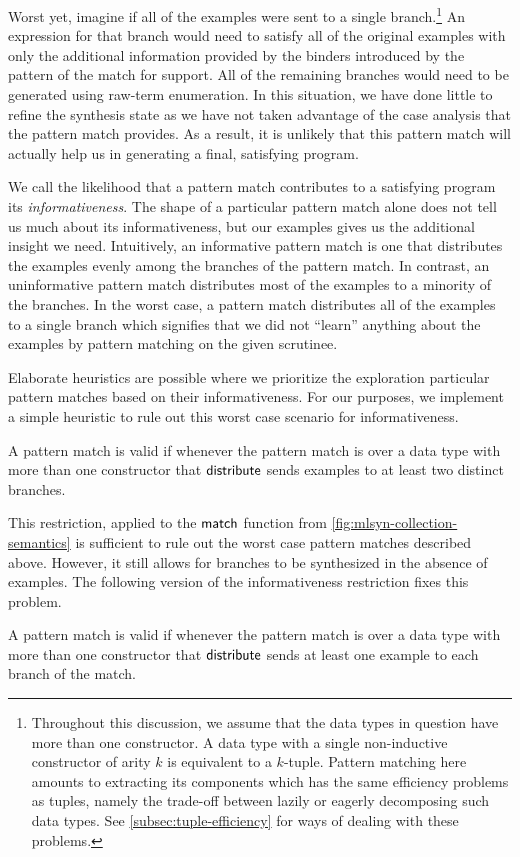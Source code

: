 Worst yet, imagine if all of the examples were sent to a single branch.\footnote{%
  Throughout this discussion, we assume that the data types in question have more than one constructor.
  A data type with a single non-inductive constructor of arity $k$ is equivalent to a $k$-tuple.
  Pattern matching here amounts to extracting its components which has the same efficiency problems as tuples, namely the trade-off between lazily or eagerly decomposing such data types.
  See \autoref{subsec:tuple-efficiency} for ways of dealing with these problems.
}
An expression for that branch would need to satisfy all of the original examples with only the additional information provided by the binders introduced by the pattern of the match for support.
All of the remaining branches would need to be generated using raw-term enumeration.
In this situation, we have done little to refine the synthesis state as we have not taken advantage of the case analysis that the pattern match provides.
As a result, it is unlikely that this pattern match will actually help us in generating a final, satisfying program.

We call the likelihood that a pattern match contributes to a satisfying program its \emph{informativeness}.
The shape of a particular pattern match alone does not tell us much about its informativeness, but our examples gives us the additional insight we need.
Intuitively, an informative pattern match is one that distributes the examples evenly among the branches of the pattern match.
In contrast, an uninformative pattern match distributes most of the examples to a minority of the branches.
In the worst case, a pattern match distributes all of the examples to a single branch which signifies that we did not ``learn'' anything about the examples by pattern matching on the given scrutinee.

Elaborate heuristics are possible where we prioritize the exploration particular pattern matches based on their informativeness.
For our purposes, we implement a simple heuristic to rule out this worst case scenario for informativeness.
\begin{definition}
  A pattern match is valid if whenever the pattern match is over a data type with more than one constructor that $\mathsf{distribute}$ sends examples to at least two distinct branches.
\end{definition}
This restriction, applied to the $\mathsf{match}$ function from \autoref{fig:mlsyn-collection-semantics} is sufficient to rule out the worst case pattern matches described above.
However, it still allows for branches to be synthesized in the absence of examples.
The following version of the informativeness restriction fixes this problem.
\begin{definition}
  A pattern match is valid if whenever the pattern match is over a data type with more than one constructor that $\mathsf{distribute}$ sends at least one example to each branch of the match.
\end{definition}

